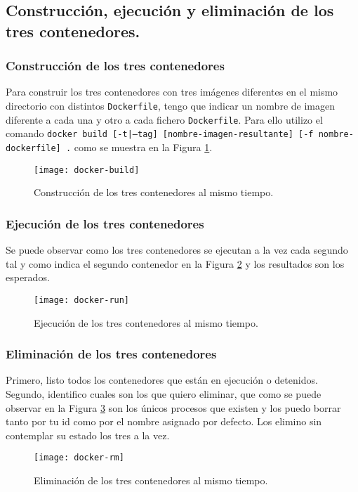 \subsection{Construcción, ejecución y eliminación de los tres contenedores.}

\subsubsection{Construcción de los tres contenedores}
\par Para construir los tres contenedores con tres imágenes diferentes en el mismo directorio con distintos \texttt{Dockerfile},
tengo que indicar un nombre de imagen diferente a cada una y otro a cada fichero \texttt{Dockerfile}.
Para ello utilizo el comando \texttt{docker build [-t|--tag] [nombre-imagen-resultante] [-f nombre-dockerfile] .} como se muestra en la Figura \ref{fig:docker-build}.
\begin{figure}[H]
    \texttt{[image: docker-build]}
    \centering
    \caption{Construcción de los tres contenedores al mismo tiempo.}
    \label{fig:docker-build}
 \end{figure}

\newpage

\subsubsection{Ejecución de los tres contenedores}
\par Se puede observar como los tres contenedores se ejecutan 
a la vez cada segundo tal y como indica el segundo contenedor en la Figura \ref{fig:docker-run}
y los resultados son los esperados.

\begin{figure}[H]
   \texttt{[image: docker-run]}
   \centering
   \caption{Ejecución de los tres contenedores al mismo tiempo.}
   \label{fig:docker-run}
\end{figure}


\subsubsection{Eliminación de los tres contenedores}
\par Primero, listo todos los contenedores que están en ejecución o detenidos. Segundo, 
identifico cuales son los que quiero eliminar, que como se puede observar en la Figura 
\ref{fig:docker-rm} son los únicos procesos que existen y los puedo borrar tanto por tu id
como por el nombre asignado por defecto. Los elimino sin contemplar su estado los tres a la vez.
 \begin{figure}[H]
	\texttt{[image: docker-rm]}
	\centering
	\caption{Eliminación de los tres contenedores al mismo tiempo.}
    \label{fig:docker-rm}
\end{figure}